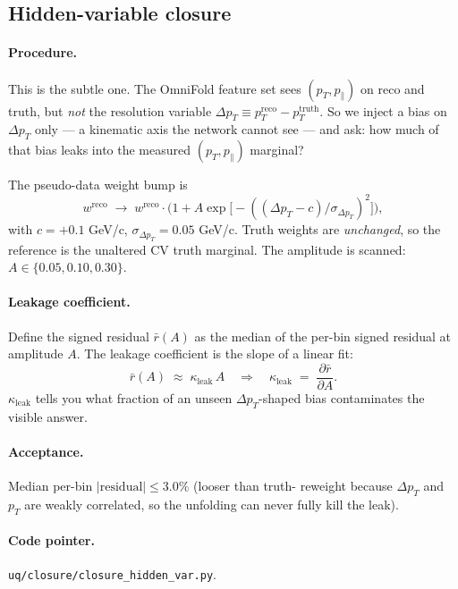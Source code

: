 \documentclass[12pt]{article}
\newcommand{\pT}{p_{T}}
\newcommand{\pPar}{p_{\parallel}}
\newcommand{\dpT}{\Delta\pT}
\begin{document}
\subsection{Hidden-variable closure}
\label{sec:closure-hv}

\paragraph{Procedure.}
This is the subtle one. The OmniFold feature set sees $(\pT,\pPar)$
on reco and truth, but \emph{not} the resolution variable
$\dpT \equiv \pT^{\text{reco}}-\pT^{\text{truth}}$. So we inject a
bias on $\dpT$ only --- a kinematic axis the network cannot see ---
and ask: how much of that bias leaks into the measured $(\pT,\pPar)$
marginal?

The pseudo-data weight bump is
\begin{equation}
w^{\text{reco}}
\;\to\;
w^{\text{reco}}\cdot
\Big(1 + A\exp\!\big[-((\dpT - c)/\sigma_{\dpT})^{2}\big]\Big),
\end{equation}
with $c=+0.1$ GeV/c, $\sigma_{\dpT}=0.05$ GeV/c. Truth weights are
\emph{unchanged}, so the reference is the unaltered CV truth
marginal. The amplitude is scanned: $A\in\{0.05,0.10,0.30\}$.

\paragraph{Leakage coefficient.}
Define the signed residual $\bar r(A)$ as the median of the per-bin
signed residual at amplitude $A$. The leakage coefficient is the slope
of a linear fit:
\begin{equation}
\bar r(A) \;\approx\; \kappa_{\text{leak}} \, A
\quad\Rightarrow\quad
\kappa_{\text{leak}}
\;=\;
\frac{\partial \bar r}{\partial A}.
\end{equation}
$\kappa_{\text{leak}}$ tells you what fraction of an unseen
$\dpT$-shaped bias contaminates the visible answer.

\paragraph{Acceptance.}
Median per-bin $|\text{residual}| \le 3.0\%$ (looser than truth-
reweight because $\dpT$ and $\pT$ are weakly correlated, so the
unfolding can never fully kill the leak).

\paragraph{Code pointer.}
\texttt{uq/closure/closure\_hidden\_var.py}.
\end{document}
